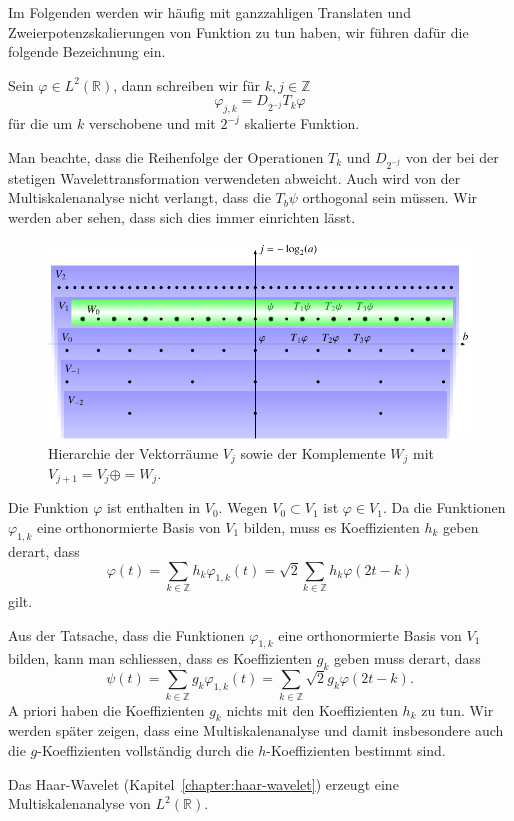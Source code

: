 Im Folgenden werden wir häufig mit ganzzahligen Translaten und
Zweierpotenzskalierungen von Funktion zu tun haben, wir führen dafür
die folgende Bezeichnung ein.

\begin{definition}
Sein $\varphi\in L^2(\mathbb R)$, dann schreiben wir für $k,j\in \mathbb Z$
\[
\varphi_{j,k} = D_{2^{-j}}T_k\varphi
\]
für die um $k$ verschobene und mit $2^{-j}$ skalierte Funktion.
\end{definition}

Man beachte, dass die Reihenfolge der Operationen $T_k$ und $D_{2^{-j}}$
von der bei der stetigen Wavelettransformation verwendeten abweicht.
Auch wird von der Multiskalenanalyse nicht verlangt, dass 
die $T_b\psi$ orthogonal sein müssen.
Wir werden aber sehen, dass sich dies immer einrichten lässt.

\begin{figure}
\centering
\includegraphics{chapters/6-msa/images/msa.pdf}
\caption{Hierarchie der Vektorräume $V_j$ sowie der Komplemente $W_j$
mit
$V_{j+1} = V_j \oplus = W_j$.
\label{msa:vektorraumhierarchie}}
\end{figure}

Die Funktion $\varphi$ ist enthalten in $V_0$.
Wegen $V_0\subset V_1$ ist $\varphi\in V_1$.
Da die Funktionen $\varphi_{1,k}$ eine orthonormierte Basis von $V_1$
bilden, muss es Koeffizienten $h_k$ geben derart, dass
\begin{equation}
\varphi(t) = \sum_{k\in\mathbb Z} h_k\varphi_{1,k}(t)
=
\sqrt{2}\sum_{k\in\mathbb Z}h_k\varphi(2t-k)
\label{msa:skalrel-h}
\end{equation}
gilt.

Aus der Tatsache, dass die Funktionen $\varphi_{1,k}$ eine orthonormierte
Basis von $V_1$ bilden, kann man schliessen, dass es Koeffizienten $g_k$
geben muss derart, dass
\begin{equation}
\psi(t)
=
\sum_{k\in\mathbb Z} g_k\varphi_{1,k}(t)
=
\sum_{k\in\mathbb Z}\sqrt{2}g_k \varphi(2t-k).
\label{msa:skalrel-g}
\end{equation}
A priori haben die Koeffizienten $g_k$ nichts mit den Koeffizienten $h_k$
zu tun.
Wir werden später zeigen, dass eine Multiskalenanalyse und damit
insbesondere auch die $g$-Koeffizienten vollständig durch
die $h$-Koeffizienten bestimmt sind.

\begin{beispiel}
Das Haar-Wavelet (Kapitel~\ref{chapter:haar-wavelet}) erzeugt eine
Multiskalenanalyse von $L^2(\mathbb R)$.
\end{beispiel}

